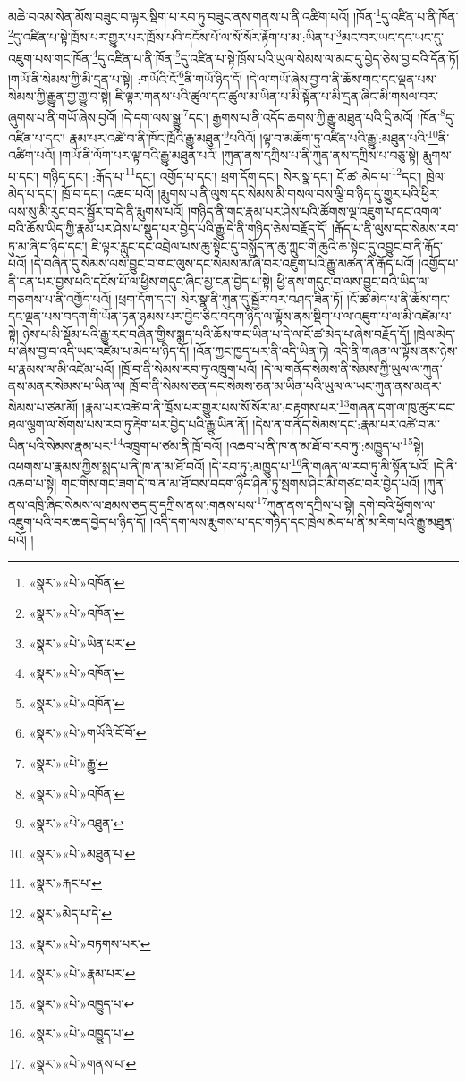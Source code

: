 མཆེ་བའམ་སེན་མོས་བཟུང་བ་ལྟར་སྡིག་པ་རབ་ཏུ་བཟུང་ནས་གནས་པ་ནི་འཚིག་པའོ། །ཁོན་\footnote{«སྣར་»«པེ་»འཁོན་}དུ་འཛིན་པ་ནི་ཁོན་\footnote{«སྣར་»«པེ་»འཁོན་}དུ་འཛིན་པ་སྟེ་ཁྲོས་པར་གྱུར་པར་ཁྲོས་པའི་དངོས་པོ་ལ་སོ་སོར་རྟོག་པ་མ་:ཡིན་པ་\footnote{«སྣར་»«པེ་»ཡིན་པར་}མང་བར་ཡང་དང་ཡང་དུ་འཇུག་པས་གང་ཁོན་\footnote{«སྣར་»«པེ་»འཁོན་}དུ་འཛིན་པ་ནི་ཁོན་\footnote{«སྣར་»«པེ་»འཁོན་}དུ་འཛིན་པ་སྟེ་ཁྲོས་པའི་ཡུལ་སེམས་ལ་མང་དུ་བྱེད་ཅེས་བྱ་བའི་དོན་ཏོ། །གཡོ་ནི་སེམས་ཀྱི་མི་དྲན་པ་སྟེ། :གཡོའི་ངོ་\footnote{«སྣར་»«པེ་»གཡོའི་ངོ་བོ་}ནི་གཡོ་ཉིད་དོ། །དེ་ལ་གཡོ་ཞེས་བྱ་བ་ནི་ཆོས་གང་དང་ལྡན་པས་སེམས་ཀྱི་རྒྱུན་གྱ་གྱུ་བ་སྟེ། ཇི་ལྟར་གནས་པའི་ཚུལ་དང་ཚུལ་མ་ཡིན་པ་མི་སྟོན་པ་མི་དྲན་ཞིང་མི་གསལ་བར་ཞུགས་པ་ནི་གཡོ་ཞེས་བྱའོ། །དེ་དག་ལས་སྒྱུ་\footnote{«སྣར་»«པེ་»རྒྱུ་}དང་། རྒྱགས་པ་ནི་འདོད་ཆགས་ཀྱི་རྒྱུ་མཐུན་པའི་དྲི་མའོ། །ཁོན་\footnote{«སྣར་»«པེ་»འཁོན་}དུ་འཛིན་པ་དང་། རྣམ་པར་འཚེ་བ་ནི་ཁོང་ཁྲོའི་རྒྱུ་མཐུན་\footnote{«སྣར་»«པེ་»འཐུན་}པའིའོ། །ལྟ་བ་མཆོག་ཏུ་འཛིན་པའི་རྒྱུ་:མཐུན་པའི་\footnote{«སྣར་»«པེ་»མཐུན་པ་}ནི་འཚིག་པའོ། །གཡོ་ནི་ལོག་པར་ལྟ་བའི་རྒྱུ་མཐུན་པའོ། །ཀུན་ནས་དཀྲིས་པ་ནི་ཀུན་ནས་དཀྲིས་པ་བཅུ་སྟེ། རྨུགས་པ་དང་། གཉིད་དང་། :རྒོད་པ་\footnote{«སྣར་»རྐང་པ་}དང་། འགྱོད་པ་དང་། ཕྲག་དོག་དང་། སེར་སྣ་དང་། ངོ་ཚ་:མེད་པ་\footnote{«སྣར་»མེད་པ་དེ་}དང་། ཁྲེལ་མེད་པ་དང་། ཁྲོ་བ་དང་། འཆབ་པའོ། །རྨུགས་པ་ནི་ལུས་དང་སེམས་མི་གསལ་བས་ལྕི་བ་ཉིད་དུ་གྱུར་པའི་ཕྱིར་ལས་སུ་མི་རུང་བར་སྦྱོར་བ་དེ་ནི་རྨུགས་པའོ། །གཉིད་ནི་གང་རྣམ་པར་ཤེས་པའི་ཚོགས་ལྔ་འཇུག་པ་དང་འགལ་བའི་ཆོས་ཡིད་ཀྱི་རྣམ་པར་ཤེས་པ་སྡུད་པར་བྱེད་པའི་རྒྱུ་དེ་ནི་གཉིད་ཅེས་བརྗོད་དོ། །རྒོད་པ་ནི་ལུས་དང་སེམས་རབ་ཏུ་མ་ཞི་བ་ཉིད་དང་། ཇི་ལྟར་རླུང་དང་འབྲེལ་པས་ཆུ་སྟེང་དུ་བསྐྱོད་ན་ཆུ་ཀླུང་གི་ཆུའི་ཆ་སྟེང་དུ་འབྱུང་བ་ནི་རྒོད་པའོ། །དེ་བཞིན་དུ་སེམས་ལས་བྱུང་བ་གང་ལུས་དང་སེམས་མ་ཞི་བར་འཇུག་པའི་རྒྱུ་མཚན་ནི་རྒོད་པའོ། །འགྱོད་པ་ནི་ངན་པར་བྱས་པའི་དངོས་པོ་ལ་ཕྱིས་གདུང་ཞིང་མྱ་ངན་བྱེད་པ་སྟེ། ཕྱི་ནས་གདུང་བ་ལས་བྱུང་བའི་ཡིད་ལ་གཅགས་པ་ནི་འགྱོད་པའོ། །ཕྲག་དོག་དང་། སེར་སྣ་ནི་ཀུན་དུ་སྦྱོར་བར་བཤད་ཟིན་ཏོ། །ངོ་ཚ་མེད་པ་ནི་ཆོས་གང་དང་ལྡན་པས་བདག་གི་ཡོན་ཏན་ཉམས་པར་བྱེད་ཅིང་བདག་ཉིད་ལ་ལྟོས་ནས་སྡིག་པ་ལ་འཇུག་པ་ལ་མི་འཛེམ་པ་སྟེ། ཉེས་པ་མི་སྡོམ་པའི་རྒྱུ་རང་བཞིན་གྱིས་སྨད་པའི་ཆོས་གང་ཡིན་པ་དེ་ལ་ངོ་ཚ་མེད་པ་ཞེས་བརྗོད་དོ། །ཁྲེལ་མེད་པ་ཞེས་བྱ་བ་འདི་ཡང་འཛེམ་པ་མེད་པ་ཉིད་དོ། །འོན་ཀྱང་ཁྱད་པར་ནི་འདི་ཡིན་ཏེ། འདི་ནི་གཞན་ལ་ལྟོས་ནས་ཉེས་པ་རྣམས་ལ་མི་འཛེམ་པའོ། །ཁྲོ་བ་ནི་སེམས་རབ་ཏུ་འཁྲུག་པའོ། །དེ་ལ་གནོད་སེམས་ནི་སེམས་ཀྱི་ཡུལ་ལ་ཀུན་ནས་མནར་སེམས་པ་ཡིན་ལ། ཁྲོ་བ་ནི་སེམས་ཅན་དང་སེམས་ཅན་མ་ཡིན་པའི་ཡུལ་ལ་ཡང་ཀུན་ནས་མནར་སེམས་པ་ཙམ་མོ། །རྣམ་པར་འཚེ་བ་ནི་ཁྲོས་པར་གྱུར་པས་སོ་སོར་མ་:བརྟགས་པར་\footnote{«སྣར་»«པེ་»བཏགས་པར་}གཞན་དག་ལ་ཁུ་ཚུར་དང་ཐལ་ལྕག་ལ་སོགས་པས་རབ་ཏུ་རྡེག་པར་བྱེད་པའི་རྒྱུ་ཡིན་ནོ། །དེས་ན་གནོད་སེམས་དང་:རྣམ་པར་འཚེ་བ་མ་ཡིན་པའི་སེམས་རྣམ་པར་\footnote{«སྣར་»«པེ་»རྣམ་པར་}འཁྲུག་པ་ཙམ་ནི་ཁྲོ་བའོ། །འཆབ་པ་ནི་ཁ་ན་མ་ཐོ་བ་རབ་ཏུ་:མཁྱུད་པ་\footnote{«སྣར་»«པེ་»འཁྱུད་པ་}སྟེ། འཕགས་པ་རྣམས་ཀྱིས་སྨད་པ་ནི་ཁ་ན་མ་ཐོ་བའོ། །དེ་རབ་ཏུ་:མཁྱུད་པ་\footnote{«སྣར་»«པེ་»འཁྱུད་པ་}ནི་གཞན་ལ་རབ་ཏུ་མི་སྟོན་པའོ། །དེ་ནི་འཆབ་པ་སྟེ། གང་གིས་གང་ཟག་དེ་ཁ་ན་མ་ཐོ་བས་བདག་ཉིད་ཤིན་ཏུ་སྦགས་ཤིང་མི་གཙང་བར་བྱེད་པའོ། །ཀུན་ནས་འཁྲི་ཞིང་སེམས་ལ་ཐམས་ཅད་དུ་དཀྲིས་ནས་:གནས་པས་\footnote{«སྣར་»«པེ་»གནས་པ་}ཀུན་ནས་དཀྲིས་པ་སྟེ། དགེ་བའི་ཕྱོགས་ལ་འཇུག་པའི་བར་ཆད་བྱེད་པ་ཉིད་དོ། །འདི་དག་ལས་རྨུགས་པ་དང་གཉིད་དང་ཁྲེལ་མེད་པ་ནི་མ་རིག་པའི་རྒྱུ་མཐུན་པའོ། །
